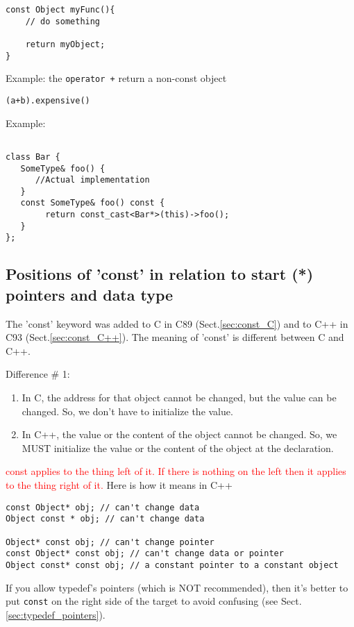 \begin{verbatim}
const Object myFunc(){
    // do something
    
    return myObject;
}
\end{verbatim}

Example: the \verb!operator +! return a non-const object
\begin{verbatim}
(a+b).expensive()
\end{verbatim}

Example:
\begin{verbatim}

class Bar {
   SomeType& foo() {
      //Actual implementation 
   }
   const SomeType& foo() const {
        return const_cast<Bar*>(this)->foo();
   }
};

\end{verbatim}


\subsection{Positions of 'const' in relation to start (*) pointers and data
type}
\label{sec:const_its-position}

The 'const' keyword was added to C in C89 (Sect.\ref{sec:const_C}) and to C++
in C93 (Sect.\ref{sec:const_C++}). The meaning of 'const' is different between C
and C++. 

Difference \# 1:
\begin{enumerate}
  \item In C, the address for that object cannot be changed, but the value can
  be changed. So, we don't have to initialize the value.
  \item In C++, the value or the content of the object cannot be changed. So, we
  MUST initialize the value or the content of the object at the declaration.
\end{enumerate}
\textcolor{red}{const applies to the thing left of it. If there is nothing on
the left then it applies to the thing right of it.} Here is how it means in C++
\begin{verbatim}
const Object* obj; // can't change data
Object const * obj; // can't change data

Object* const obj; // can't change pointer
const Object* const obj; // can't change data or pointer
Object const* const obj; // a constant pointer to a constant object
\end{verbatim}
If you allow typedef's pointers (which is NOT recommended), then it's better to
put \verb!const! on the right side of the target to avoid confusing (see
Sect.\ref{sec:typedef_pointers}). 


